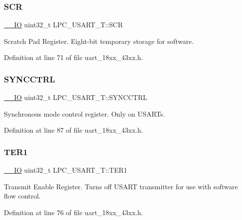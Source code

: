 \subsubsection{\texorpdfstring{S\+CR}{SCR}}
{\footnotesize\ttfamily \hyperlink{core__sc300_8h_aec43007d9998a0a0e01faede4133d6be}{\+\_\+\+\_\+\+IO} uint32\+\_\+t L\+P\+C\+\_\+\+U\+S\+A\+R\+T\+\_\+\+T\+::\+S\+CR}

Scratch Pad Register. Eight-\/bit temporary storage for software. 

Definition at line 71 of file uart\+\_\+18xx\+\_\+43xx.\+h.

\mbox{\label{struct_l_p_c___u_s_a_r_t___t_a799433e27ab7a1b61ba215ff1766a3e0}} 
\subsubsection{\texorpdfstring{S\+Y\+N\+C\+C\+T\+RL}{SYNCCTRL}}
{\footnotesize\ttfamily \hyperlink{core__sc300_8h_aec43007d9998a0a0e01faede4133d6be}{\+\_\+\+\_\+\+IO} uint32\+\_\+t L\+P\+C\+\_\+\+U\+S\+A\+R\+T\+\_\+\+T\+::\+S\+Y\+N\+C\+C\+T\+RL}

Synchronous mode control register. Only on U\+S\+A\+R\+Ts. 

Definition at line 87 of file uart\+\_\+18xx\+\_\+43xx.\+h.

\mbox{\label{struct_l_p_c___u_s_a_r_t___t_afa3989925f4b5c3edd74531748ccccb2}} 
\subsubsection{\texorpdfstring{T\+E\+R1}{TER1}}
{\footnotesize\ttfamily \hyperlink{core__sc300_8h_aec43007d9998a0a0e01faede4133d6be}{\+\_\+\+\_\+\+IO} uint32\+\_\+t L\+P\+C\+\_\+\+U\+S\+A\+R\+T\+\_\+\+T\+::\+T\+E\+R1}

Transmit Enable Register. Turns off U\+S\+A\+RT transmitter for use with software flow control. 

Definition at line 76 of file uart\+\_\+18xx\+\_\+43xx.\+h.

